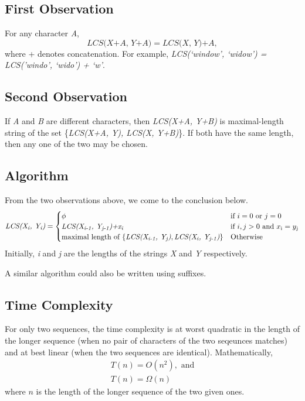 \documentclass[12pt, a4paper]{article}
\theoremstyle{definition}
\theoremstyle{remark}
\newcommand{\textsb}{\textsubscript}
\begin{document}
\subsection{First Observation}
For any character \textit{A},
\begin{equation*}
    \textit{LCS(X+A, Y+A)} = \textit{LCS(X, Y)+A},
\end{equation*}
where + denotes concatenation.
% 
For example, \textit{LCS(`window', `widow') = LCS('windo', `wido') + `w'}.

\subsection{Second Observation}
If \textit{A} and \textit{B} are different characters, then \textit{LCS(X+A, Y+B)} is maximal-length string of the set \{\textit{LCS(X+A, Y), LCS(X, Y+B)}\}. If both have the same length, then any one of the two may be chosen.

\subsection{Algorithm}
From the two observations above, we come to the conclusion below.
\begin{equation}
    \textit{LCS(X\textsb{i}, Y\textsb{i})} = \begin{cases}
        \phi                                                                                                             & \text{if } i = 0 \text{ or } j = 0                         \\
        \textit{LCS(X\textsb{i-1}, Y\textsb{j-1})+x\textsb{i}}                                                           & \text{if } i, j > 0 \text{ and } x\textsb{i} = y\textsb{j} \\
        \text{maximal length of } \{\textit{LCS(X\textsb{i-1}, Y\textsb{j})}, \textit{LCS(X\textsb{i}, Y\textsb{j-1})}\} & \text{Otherwise}                                           \\
    \end{cases}
\end{equation}
Initially, \textit{i} and \textit{j} are the lengths of the strings \textit{X} and \textit{Y} respectively.

A similar algorithm could also be written using suffixes.

\subsection{Time Complexity}
For only two sequences, the time complexity is at worst quadratic in the length of the longer sequence (when no pair of characters of the two seqeunces matches) and at best linear (when the two sequences are identical). Mathematically,
\begin{gather*}
    T(n) = O(n^2),\text{ and} \\
    T(n) = \Omega(n)
\end{gather*}
where $n$ is the length of the longer sequence of the two given ones.
\end{document}
